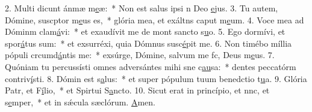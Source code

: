 2. Multi dicunt ánmæ m\uline{e}æ:~* Non est salus ipsi n Deo \uline{e}jus.
3. Tu autem, Dómine, suscptor m\uline{e}us es,~* glória mea, et exáltns caput m\uline{e}um.
4. Voce mea ad Dóminm clam\uline{á}vi:~* et exaudívit me de mont sancto s\uline{u}o.
5. Ego dormívi, et spor\uline{á}tus sum:~* et exsurréxi, quia Dómnus susc\uline{é}pit me.
6. Non timébo míllia pópuli crcumd\uline{á}ntis me:~* exsúrge, Dómine, salvum me fc, Deus m\uline{e}us.
7. Quóniam tu percussísti omnes adversántes mihi sne c\uline{au}sa:~* dentes peccatórm contriv\uline{í}sti.
8. Dómin est s\uline{a}lus:~* et super pópulum tuum benedctio t\uline{u}a.
9. Glória Patr, et F\uline{í}lio,~* et Spirtui S\uline{a}ncto.
10. Sicut erat in princípio, et nnc, et s\uline{e}mper,~* et in sǽcula sæclórum. \uline{A}men.
